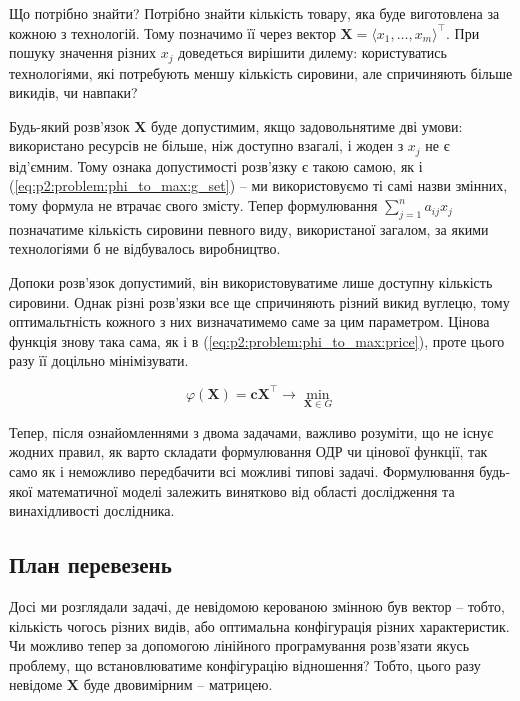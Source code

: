 \documentclass[\main/book.tex]{subfiles}
\begin{document}
Що потрібно знайти? Потрібно знайти кількість товару, яка буде виготовлена за кожною з технологій. Тому позначимо її через вектор $\mathbf{X} = \langle x_1, \ldots, x_m \rangle^\top$. При пошуку значення різних $x_j$ доведеться вирішити дилему: користуватись технологіями, які потребують меншу кількість сировини, але спричиняють більше викидів, чи навпаки?

Будь-який розв'язок $\mathbf{X}$ буде допустимим, якщо задовольнятиме дві умови: використано ресурсів не більше, ніж доступно взагалі, і жоден з $x_j$ не є від'ємним. Тому ознака допустимості розв'язку є такою самою, як і (\ref{eq:p2:problem:phi_to_max:g_set}) -- ми використовуємо ті самі назви змінних, тому формула не втрачає свого змісту. Тепер формулювання ${\sum_{j=1}^n a_{ij} x_j}$ позначатиме кількість сировини певного виду, використаної загалом, за якими технологіями б не відбувалось виробництво.

Допоки розв'язок допустимий, він використовуватиме лише дос\-туп\-ну кількість сировини. Однак різні розв'язки все ще спричиняють різний викид вуглецю, тому оптимальтність кожного з них визначатимемо саме за цим параметром. Цінова функція знову така сама, як і в (\ref{eq:p2:problem:phi_to_max:price}), проте цього разу її доцільно мінімізувати.

\begin{equation}
 \varphi(\mathbf{X}) =
 \mathbf{c} \mathbf{X}^\top
 \rightarrow \min_{\mathbf{X} \in G}
\end{equation}

\begin{note}
Тепер, після ознайомленнями з двома задачами, важливо розуміти, що не існує жодних правил, як варто складати формулювання ОДР чи цінової функції, так само як і неможливо передбачити всі можливі \flqq{}типові задачі\frqq{}. Формулювання будь-якої математичної моделі залежить винятково від області дослідження та винахідливості дослідника.
\end{note}

\subsection{План перевезень}
\label{subsection:linear:transportation_problem}

Досі ми розглядали задачі, де невідомою керованою змінною був вектор -- тобто, кількість чогось різних видів, або оптимальна конфігурація різних характеристик. Чи можливо тепер за допомогою лінійного програмування розв'язати якусь проблему, що встановлюватиме конфігурацію відношення? Тобто, цього разу невідоме $\mathbf{X}$ буде двовимірним -- матрицею.
\end{document}
